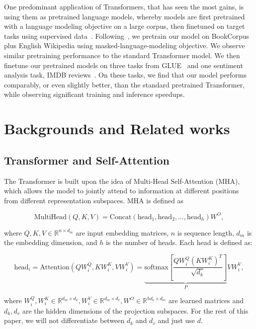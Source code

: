 One predominant application of Transformers, that has seen the most gains, is using them as pretrained language models, whereby models are first pretrained with a language modeling objective on a large corpus, then finetuned on target tasks using supervised data~\citep{devlin2019bert,liu2019roberta,lewis2019bart}. Following~\cite{devlin2019bert}, we pretrain our model on BookCorpus~\citep{zhu2015aligning} plus English Wikipedia using masked-language-modeling objective. We observe similar pretraining performance to the standard Transformer model. We then finetune our pretrained models on three tasks from GLUE~\citep{DBLP:journals/corr/abs-1804-07461} and one sentiment analysis task, IMDB reviews~\citep{maas2011learning}. On these tasks, we find that our model performs comparably, or even slightly better, than the standard pretrained Transformer, while observing significant training and inference speedups.

\section{Backgrounds and Related works}

\subsection{Transformer and Self-Attention}

The Transformer is built upon the idea of Multi-Head Self-Attention (MHA), which allows the model to jointly attend to information at different positions from different representation subspaces. MHA is defined as

\begin{equation}
\mbox{MultiHead}(Q, K, V) = \mbox{Concat}(\mbox{head}_1,\mbox{head}_2,\ldots,\mbox{head}_h)W^O,
\end{equation}

where $Q,K,V\in\mathbb{R}^{n\times d_m}$ are input embedding matrices, $n$ is sequence length, $d_m$ is the embedding dimension, and $h$ is the number of heads. Each head is defined as:

\begin{equation}
\mbox{head}_i = \mbox{Attention}(QW_i^Q, KW_i^K, VW_i^V)
= \underbrace{\mbox{softmax}\left[\frac{QW_i^Q(KW_i^K)^T}{\sqrt{d_k}}\right]}_{P}VW_i^V,
\label{eq:selfattention}
\end{equation}

where $W_i^Q, W_i^K\in\mathbb{R}^{d_m\times d_k}, W_i^V\in\mathbb{R}^{d_m\times d_v}, W^O\in\mathbb{R}^{hd_v\times d_m}$ are learned matrices and $d_k, d_v$ are the hidden dimensions of the projection subspaces. For the rest of this paper, we will not differentiate between $d_k$ and $d_v$ and just use $d$. 

